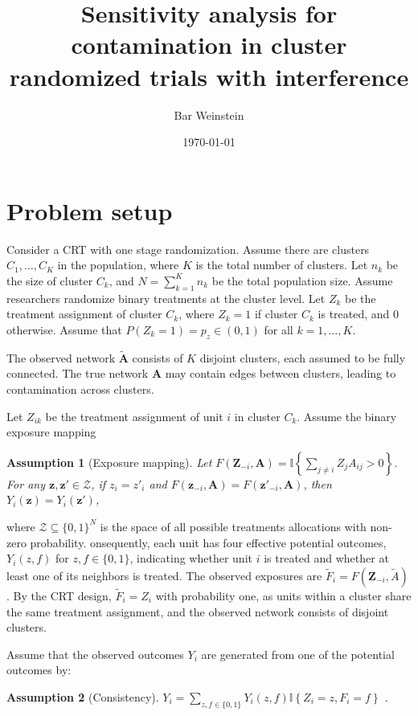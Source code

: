 \documentclass{article}[12pt]
\title{Sensitivity analysis for contamination in cluster randomized trials with interference}
\author{Bar Weinstein}
\date{\today}
\newtheorem{assumption}{Assumption}
\theoremstyle{definition}
\def \bz {\boldsymbol{z}}
\def \bZ {\boldsymbol{Z}}
\def \bA {\boldsymbol{A}}
\begin{document}
\maketitle


\section{Problem setup}
Consider a CRT with one stage randomization. Assume there are clusters
$C_1, \ldots, C_K$ in the population, where $K$ is the total number of clusters.
Let $n_k$ be the size of cluster $C_k$, and $N = \sum_{k=1}^K n_k$ be the total population size.
Assume researchers randomize binary treatments at the cluster level. 
Let $Z_k$ be the treatment assignment of cluster $C_k$, where $Z_k=1$ if cluster $C_k$ is treated, and $0$ otherwise.
Assume that $P(Z_k = 1) = p_z \in (0,1)$ for all $k=1,\ldots,K$.

The observed network $\widetilde{\bA}$ consists of $K$ disjoint clusters, each 
assumed to be fully connected. The true network $\bA$ may contain edges between clusters,
leading to contamination across clusters.

Let $Z_{ik}$ be the treatment assignment of unit $i$ in cluster $C_k$.
Assume the binary exposure mapping
\begin{assumption}[Exposure mapping]
\label{ass:expos_map}
    Let $F(\bZ_{-i},\bA) =\mathbb{I}\left\{\sum_{j\neq i} Z_jA_{ij} > 0\right\}$. For any $\bz, \bz' \in \mathcal{Z}$, if $z_i = z'_i$ and $F(\bz_{-i},\bA) = F(\bz'_{-i},\bA)$, then $Y_i(\bz) = Y_i(\bz')$, 
\end{assumption}
where $\mathcal{Z} \subseteq \{0,1\}^N$ is the space of all possible treatments allocations with 
non-zero probability.
onsequently, each unit has four effective potential outcomes,
$Y_i(z,f)$ for $z,f\in\{0,1\}$, indicating whether unit $i$ is treated and whether at least one of its neighbors is treated.
The observed exposures are $\widetilde{F}_i = F(\bZ_{-i}, \widetilde{A})$.
By the CRT design, $\widetilde{F}_i = Z_i$ with probability one, 
as units within a cluster share the same treatment assignment, and the observed network 
consists of disjoint clusters.

Assume that the observed outcomes $Y_i$ are generated from one of the potential outcomes by:
\begin{assumption}[Consistency]
\label{ass:consis}
$Y_i = \sum_{z,f \in \{0,1\}}Y_i(z,f) \mathbb{I}\left\{Z_i=z, F_i=f\right\}$ .    
\end{assumption}
\end{document}
